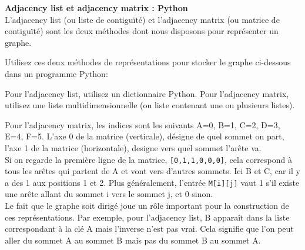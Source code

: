 \begin{Exercice}[10 minutes]  \textbf{Adjacency list et adjacency matrix : Python}\\
    L'adjacency list (ou liste de contiguïté) et l'adjacency matrix (ou matrice de contiguïté) sont les deux méthodes dont nous disposons pour représenter un graphe. \newline 
    
    Utilisez ces deux méthodes de représentations pour stocker le graphe ci-dessous dans un programme Python\!: \\
    \begin{center}
\end{center}
    \begin{conseil}
    Pour l'adjacency list, utilisez un dictionnaire Python. Pour l'adjacency matrix, utilisez une liste multidimensionnelle (ou liste contenant une ou plusieurs listes).
    \end{conseil}
    \begin{solution}
        
    \end{solution}

    \begin{solution}
    
    Pour l'adjacency matrix, les indices sont les suivants A=0, B=1, C=2, D=3, E=4, F=5. L'axe 0 de la matrice (verticale), désigne de quel sommet on part, l'axe 1 de la matrice (horizontale), designe vers quel sommet l'arête va.\\
    Si on regarde la première ligne de la matrice, \lstinline{[0,1,1,0,0,0]}, cela correspond à tous les arêtes qui partent de A et vont vers d'autres sommets. Ici B et C, car il y a des 1 aux positions 1 et 2.
    Plus généralement, l'entrée \lstinline{M[i][j]} vaut 1 s'il existe une arête allant du sommet i vers le sommet j, et 0 sinon.\\
    Le fait que le graphe soit dirigé joue un rôle important pour la construction de ces représentations. Par exemple, pour l'adjacency list, B apparaît dans la liste correspondant à la clé A mais l'inverse n'est pas vrai. Cela signifie que l'on peut aller du sommet A au sommet B mais pas du sommet B au sommet A.\\


\end{solution}
\end{Exercice}
